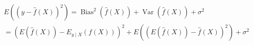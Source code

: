 ﻿\documentclass{article}
\begin{document}
\begin{preview}
\(\displaystyle
\begin{gathered}
  E\left((y-\hat f(X))^2\right)
  = \operatorname{Bias}^2(\hat f(X))+\operatorname{Var}(\hat f(X))+\sigma^2 \\
  = \left(E(\hat f(X))-E_{y\mid X}(f(X))\right)^2
  +E\left((E(\hat f(X))-\hat f(X))^2\right)+\sigma^2
\end{gathered}
\)
\end{preview}
\end{document}
